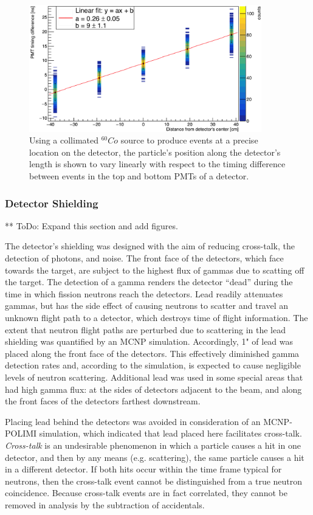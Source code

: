 \begin{figure}
    \centering
    \includegraphics[width = 0.9\textwidth]{Content/Methods/PMTDifference.png}
    \caption{Using a collimated $^{60}Co$ source to produce events at a precise location on the detector, the particle's position along the detector's length is shown to vary linearly with respect to the timing difference between events in the top and bottom PMTs of a detector.}
    \label{fig:PMTDifference}
\end{figure}
\subsubsection{Detector Shielding}
** ToDo: Expand this section and add figures. 

The detector's shielding was designed with the aim of reducing cross-talk, the detection of photons, and noise.
The front face of the detectors, which face towards the target, are subject to the highest flux of gammas due to scatting off the target.
The detection of a gamma renders the detector ``dead'' during the time in which fission neutrons reach the detectors.
Lead readily attenuates gammas, but has the side effect of causing neutrons to scatter and travel an unknown flight path to a detector, which destroys time of flight information.
The extent that neutron flight paths are perturbed due to scattering in the lead shielding was quantified by an MCNP simulation.
Accordingly, 1" of lead was placed along the front face of the detectors.
This effectively diminished gamma detection rates and, according to the simulation, is expected to cause negligible levels of neutron scattering.
Additional lead was used in some special areas that had high gamma flux: at the sides of detectors adjacent to the beam, and along the front faces of the detectors farthest downstream.

Placing lead behind the detectors was avoided in consideration of an MCNP-POLIMI simulation, which indicated that lead placed here facilitates cross-talk. \textit{Cross-talk} is an undesirable phenomenon in which a particle causes a hit in one detector, and then by any means (e.g. scattering), the same particle causes a hit in a different detector.
If both hits occur within the time frame typical for neutrons, then the cross-talk event cannot be distinguished from a true neutron coincidence.
Because cross-talk events are in fact correlated, they cannot be removed in analysis by the subtraction of accidentals.

